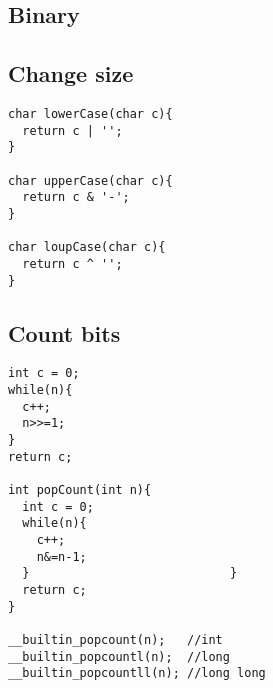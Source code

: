 \documentclass[twoside]{article}
\begin{document}
\begin{multicols*}{2}
	\tableofcontents
\end{multicols*}
\begin{multicols*}{2}
{
[\vspace{2em}]
\section*{Binary}
}
{
\subsection*{Change size}
}
\begin{verbatim}
char lowerCase(char c){
  return c | '';
}

char upperCase(char c){
  return c & '-';
}

char loupCase(char c){
  return c ^ '';
}

\end{verbatim}

{
\subsection*{Count bits}
}
\begin{verbatim}
int c = 0;
while(n){
  c++;
  n>>=1;
}
return c;

int popCount(int n){
  int c = 0;
  while(n){
    c++;
    n&=n-1;
  }                            }
  return c;
}

__builtin_popcount(n);   //int
__builtin_popcountl(n);  //long
__builtin_popcountll(n); //long long


\end{verbatim}
\end{multicols*}
\end{document}
